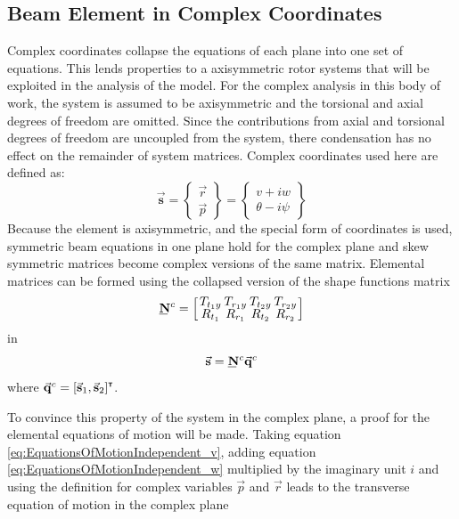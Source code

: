 \subsection{Beam Element in Complex Coordinates} \label{Beam Element in Complex Coordinates}
Complex coordinates collapse the equations of each plane into one set of equations. This lends properties to a axisymmetric rotor systems that will be exploited in the analysis of the model. For the complex analysis in this body of work, the system is assumed to be axisymmetric and the torsional and axial degrees of freedom are omitted. Since the contributions from axial and torsional degrees of freedom are uncoupled from the system, there condensation has no effect on the remainder of system matrices. Complex coordinates used here are defined as:
\begin{equation}\label{eq:ComplexCoordinates}
\vec{\mathbf{s}}=\left\{\begin{array}{c}
\vec{r}\\
\vec{p}
\end{array}\right\}=\left\{\begin{array}{c}
v+iw\\
\theta-i\psi\end{array}\right\}
\end{equation}
Because the element is axisymmetric, and the special form of coordinates is used, symmetric beam equations in one plane hold for the complex plane and skew symmetric matrices become complex versions of the same matrix. Elemental matrices can be formed using the collapsed version of the shape functions matrix
\begin{equation}\label{ShapeFunctionMatrixComplex}
\def\cs{2em}
\bunderline{\mathbf{N}}^c=\left[\def\arraystretch{.8}\arraycolsep=0em\begin{array}{cccc}
\makebox[\cs]{$T_{t_1y}$}&\makebox[\cs]{$T_{r_1y}$}&\makebox[\cs]{$T_{t_2y}$}&\makebox[\cs]{$T_{r_2y}$}\\
R_{t_1}&R_{r_1}&R_{t_2}&R_{r_2}
\end{array}\right]
\end{equation}
in 
\begin{equation}\label{eq:FEGoverningComplex}
\vec{\mathbf{s}}=\bunderline{\mathbf{N}}^c\vec{\mathbf{q}}^c
\end{equation}
where $ \vec{\mathbf{q}}^c=[\vec{\mathbf{s}}_1,\vec{\mathbf{s}}_2]^{\textbf{{\tiny \textsf{T}}}} $.\par 
To convince this property of the system in the complex plane, a proof for the elemental equations of motion will be made. Taking equation \eqref{eq:EquationsOfMotionIndependent_v}, adding equation \eqref{eq:EquationsOfMotionIndependent_w} multiplied by the imaginary unit $ i $ and using the definition for complex variables $ \vec{p} $ and $ \vec{r} $ leads to the transverse equation of motion in the complex plane
